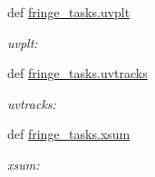\begin{DoxyCompactItemize}
def \hyperlink{namespacefringe__tasks_ad4a99902710e206a6806c7bcf5dd6f9d}{fringe\-\_\-tasks.\-uvplt}
\begin{DoxyCompactList}\small\item\em uvplt\-: \end{DoxyCompactList}\item 
def \hyperlink{namespacefringe__tasks_a1ea5f86b1406b19e26971ac67206ffd4}{fringe\-\_\-tasks.\-uvtracks}
\begin{DoxyCompactList}\small\item\em uvtracks\-: \end{DoxyCompactList}\item 
def \hyperlink{namespacefringe__tasks_a2b344d5c0c9c76f2775ee2336e220b70}{fringe\-\_\-tasks.\-xsum}
\begin{DoxyCompactList}\small\item\em xsum\-: \end{DoxyCompactList}\end{DoxyCompactItemize}
